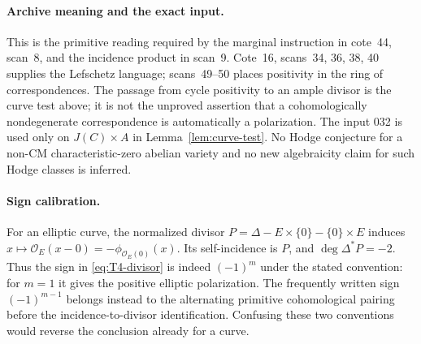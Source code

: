 \paragraph{Archive meaning and the exact input.}
This is the primitive reading required by the marginal instruction in
cote~44, scan~8, and the incidence product in scan~9. Cote~16,
scans~34, 36, 38, 40 supplies the Lefschetz language; scans~49--50 places
positivity in the ring of correspondences. The passage from cycle
positivity to an ample divisor is the curve test above; it is not the
unproved assertion that a cohomologically nondegenerate correspondence
is automatically a polarization. The input 032 is used only on
$J(C)\times A$ in Lemma~\ref{lem:curve-test}. No Hodge conjecture for a
non-CM characteristic-zero abelian variety and no new algebraicity
claim for such Hodge classes is inferred.

\paragraph{Sign calibration.}
For an elliptic curve, the normalized divisor
$P=\Delta-E\times\{0\}-\{0\}\times E$ induces
$x\mapsto\mathcal O_E(x-0)=-\phi_{\mathcal O_E(0)}(x)$.
Its self-incidence is $P$, and $\deg\Delta^*P=-2$.
Thus the sign in \eqref{eq:T4-divisor} is indeed $(-1)^m$ under the
stated convention: for $m=1$ it gives the positive elliptic
polarization. The frequently written sign $(-1)^{m-1}$ belongs instead
to the alternating primitive cohomological pairing before the
incidence-to-divisor identification. Confusing these two conventions
would reverse the conclusion already for a curve.
